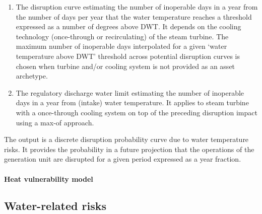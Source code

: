 \documentclass[a4paper,11pt]{extarticle} %
\theoremstyle{definition}
\begin{document}
\begin{enumerate}
$${\left(\text{\#days/year WBGT }> \text{WBGT}^{99\%}_{\text{baseline}}\right)}
$$
with $\Phi_{\rho}$ the cumulative distribution functions of a $\rho$-correlated standard normal random pair. Scaled by the probability in a climate-conditioned projection that WBGT exceeds the 99\%-quantile of the baseline scenario, it replaces the unconditional discrete exceedance probability curve calculated in the first step when the generation unit features a steam turbine with a recirculating cooling system. DWT is also capped at 24.7°C\footnote{The intake water temperature equivalent to a 35°C discharge water temperature given the linear approximation:
$$
T_{\text{discharge}}=1.0191\times T_{\text{intake}}+9.7951^{\circ}C
$$
}.
\item The disruption curve estimating the number of inoperable days in a year from the number of days per year that the water temperature reaches a threshold expressed as a number of degrees above DWT. It depends on the cooling technology (once-through or recirculating) of the steam turbine. The maximum number of inoperable days interpolated for a given `water temperature above DWT' threshold across potential disruption curves is chosen when turbine and/or cooling system is not provided as an asset archetype.
\item The regulatory discharge water limit estimating the number of inoperable days in a year from (intake) water temperature. It applies to steam turbine with a once-through cooling system on top of the preceding disruption impact using a max-of approach.
\end{enumerate}
The output is a discrete disruption probability curve due to water temperature risks. It provides the probability in a future projection that the operations of the generation unit are disrupted for a given period expressed as a year fraction.

\paragraph{Heat vulnerability model}


\subsection{Water-related risks}
\end{document}
